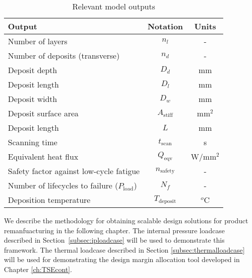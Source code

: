 \begin{table}[h!]
	\centering
	\renewcommand{\arraystretch}{1.0}%
	\normalsize\addtolength{\tabcolsep}{-5pt}
	\caption{Relevant model outputs}
	\label{table:modeloutputs}
	\begin{tabular}{lcc}
	\hline\hline
	\bf Output    & \bf Notation & \bf Units \\ \hline
	Number of layers & $n_l$ & - \\
	Number of deposits (transverse) & $n_d$ & - \\
	Deposit depth  & $D_d$ & mm \\
	Deposit length  & $D_l$ & mm \\
	Deposit width  & $D_w$ & mm \\
	Deposit surface area  & $A_\textrm{stiff}$ & mm$^2$ \\
	Deposit length  & $L$ & mm \\
	Scanning time  & $t_\textrm{scan}$ & s \\
	Equivalent heat flux  & $Q_\textrm{eqv}$ & W/mm$^2$ \\
	Safety factor against low-cycle fatigue & $n_{\textrm{safety}}$ & - \\
	Number of lifecycles to failure (${P}_{\textrm{load}}$)& $N_f$ & - \\
	Deposition temperature & $T_\textrm{deposit}$ & $^o$C \\
	\hline\hline
	\end{tabular}
\end{table}

We describe the methodology for obtaining scalable design solutions for product remanfuacturing in the following chapter. The internal pressure loadcase described in Section~\ref{subsec:iploadcase} will be used to demonstrate this framework. The thermal loadcase described in Section \ref{subsec:thermalloadcase} will be used for demonstrating the design margin allocation tool developed in Chapter \ref{ch:TSEcont}.
